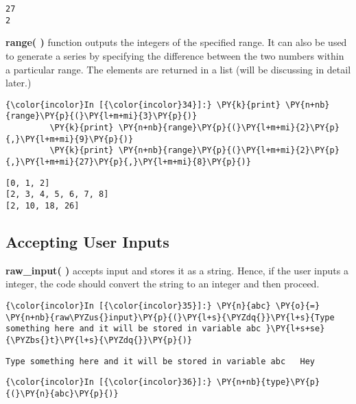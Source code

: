     \begin{Verbatim}[commandchars=\\\{\}]
27
2
    \end{Verbatim}

    \textbf{range( )} function outputs the integers of the specified range.
It can also be used to generate a series by specifying the difference
between the two numbers within a particular range. The elements are
returned in a list (will be discussing in detail later.)

    \begin{Verbatim}[commandchars=\\\{\}]
{\color{incolor}In [{\color{incolor}34}]:} \PY{k}{print} \PY{n+nb}{range}\PY{p}{(}\PY{l+m+mi}{3}\PY{p}{)}
         \PY{k}{print} \PY{n+nb}{range}\PY{p}{(}\PY{l+m+mi}{2}\PY{p}{,}\PY{l+m+mi}{9}\PY{p}{)}
         \PY{k}{print} \PY{n+nb}{range}\PY{p}{(}\PY{l+m+mi}{2}\PY{p}{,}\PY{l+m+mi}{27}\PY{p}{,}\PY{l+m+mi}{8}\PY{p}{)}
\end{Verbatim}

    \begin{Verbatim}[commandchars=\\\{\}]
[0, 1, 2]
[2, 3, 4, 5, 6, 7, 8]
[2, 10, 18, 26]
    \end{Verbatim}

    \subsection{Accepting User Inputs}\label{accepting-user-inputs}

    \textbf{raw\_input( )} accepts input and stores it as a string. Hence,
if the user inputs a integer, the code should convert the string to an
integer and then proceed.

    \begin{Verbatim}[commandchars=\\\{\}]
{\color{incolor}In [{\color{incolor}35}]:} \PY{n}{abc} \PY{o}{=} \PY{n+nb}{raw\PYZus{}input}\PY{p}{(}\PY{l+s}{\PYZdq{}}\PY{l+s}{Type something here and it will be stored in variable abc }\PY{l+s+se}{\PYZbs{}t}\PY{l+s}{\PYZdq{}}\PY{p}{)}
\end{Verbatim}

    \begin{Verbatim}[commandchars=\\\{\}]
Type something here and it will be stored in variable abc 	Hey
    \end{Verbatim}

    \begin{Verbatim}[commandchars=\\\{\}]
{\color{incolor}In [{\color{incolor}36}]:} \PY{n+nb}{type}\PY{p}{(}\PY{n}{abc}\PY{p}{)}
\end{Verbatim}

